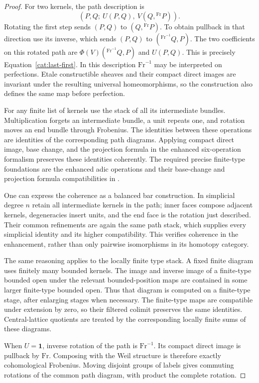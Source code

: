 \begin{proof}
For two kernels, the path description is
\[
 (P,Q;\ U(P,Q),\ V(Q,{}^{\mathrm{Fr}}P)).
\]
Rotating the first step sends $(P,Q)$ to $(Q,{}^{\mathrm{Fr}}P)$.
To obtain pullback in that direction use its inverse, which sends
$(P,Q)$ to $({}^{\mathrm{Fr}^{-1}}Q,P)$. The two coefficients on this
rotated path are $\Phi(V)({}^{\mathrm{Fr}^{-1}}Q,P)$ and $U(P,Q)$.
This is precisely Equation~\eqref{cat:last-first}. In this
description $\mathrm{Fr}^{-1}$ may be interpreted on perfections. Etale
constructible sheaves and their compact direct images are
invariant under the resulting universal homeomorphisms, so the
construction also defines the same map before perfection.

For any finite list of kernels use the stack of all its
intermediate bundles. Multiplication forgets an intermediate
bundle, a unit repeats one, and rotation moves an end bundle
through Frobenius. The identities between these operations are
identities of the corresponding path diagrams. Applying compact
direct image, base change, and the projection formula in the
enhanced six-operation formalism preserves these identities
coherently. The required precise finite-type foundations are
the enhanced adic operations and their base-change and projection
formula compatibilities in
\cite[Section~7.1 and Theorem~7.2.7]{LiuZheng}.

One can express the coherence as a balanced bar construction.
In simplicial degree $n$ retain all intermediate kernels in the
path; inner faces compose adjacent kernels, degeneracies insert
units, and the end face is the rotation just described.
Their common refinements are again the same path stack, which
supplies every simplicial identity and its higher compatibility.
This verifies coherence in the enhancement, rather than only
pairwise isomorphisms in its homotopy category.

The same reasoning applies to the locally finite type stack.
A fixed finite diagram uses finitely many bounded kernels.
The image and inverse image of a finite-type bounded open under
the relevant bounded-position maps are contained in some larger
finite-type bounded open. Thus that diagram is computed on a
finite-type stage, after enlarging stages when necessary.
The finite-type maps are compatible under extension by zero,
so their filtered colimit preserves the same identities.
Central-lattice quotients are treated by the corresponding
locally finite sums of these diagrams.

When $U=\mathbf1$, inverse rotation of the path is $\mathrm{Fr}^{-1}$.
Its compact direct image is pullback by $\mathrm{Fr}$. Composing with the
Weil structure is therefore exactly cohomological Frobenius.
Moving disjoint groups of labels gives commuting rotations of
the common path diagram, with product the complete rotation.
\end{proof}


